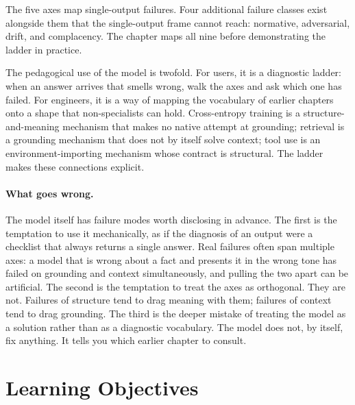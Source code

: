 The five axes map single-output failures. Four additional failure
classes exist alongside them that the single-output frame cannot
reach: normative, adversarial, drift, and complacency. The chapter
maps all nine before demonstrating the ladder in practice.

The pedagogical use of the model is twofold. For users, it is a
diagnostic ladder: when an answer arrives that smells wrong, walk
the axes and ask which one has failed. For engineers, it is a way
of mapping the vocabulary of earlier chapters onto a shape that
non-specialists can hold. Cross-entropy training is a structure-
and-meaning mechanism that makes no native attempt at grounding;
retrieval is a grounding mechanism that does not by itself solve
context; tool use is an environment-importing mechanism whose
contract is structural. The ladder makes these connections
explicit.

\paragraph{What goes wrong.}
The model itself has failure modes worth disclosing in advance.
The first is the temptation to use it mechanically, as if the
diagnosis of an output were a checklist that always returns a
single answer. Real failures often span multiple axes: a model
that is wrong about a fact and presents it in the wrong tone has
failed on grounding and context simultaneously, and pulling the
two apart can be artificial. The second is the temptation to treat
the axes as orthogonal. They are not. Failures of structure tend to
drag meaning with them; failures of context tend to drag grounding.
The third is the deeper mistake of treating the model as a solution
rather than as a diagnostic vocabulary. The model does not, by
itself, fix anything. It tells you which earlier chapter to
consult.

\section{Learning Objectives}

